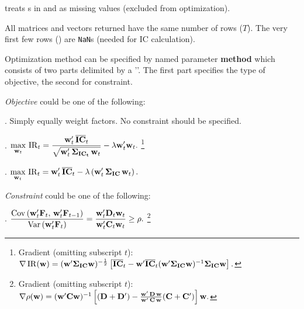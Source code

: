 \begin{enumerate*}
  \item {} treats s in  and  as missing values
       (excluded from optimization).
  \item All matrices and vectors returned have the same number of rows ($T$).
        The very first few rows () are \texttt{NaN}s (needed for IC calculation).
  \item Optimization method can be specified by named parameter \textbf{method}
        which consists of two parts delimited by a '\mcode{:}'. 
        The first part specifies the type of objective, the second for constraint.

        \begin{itemize*}
        \item \emph{Objective} could be one of the following:
	        \begin{enumerate*}
           \setlength{\itemsep}{6pt}
	        \item {}. Simply equally weight factors. No constraint should be specified.
	        \item {}.
		       $\displaystyle
		       \max_{\mathbf{w}_t}\,\operatorname{IR}_t = \frac{\mathbf{w}_t'\,\overline{\mathbf{IC}}_t}
		                                     {\sqrt{\mathbf{w}_t'\,\bm{\Sigma}_{\mathbf{IC_t}}\,\mathbf{w}_t}}
		            - \lambda \mathbf{w}_t'\mathbf{w}_t.
		       $
             \footnote{Gradient (omitting subscript $t$):
             $\nabla\operatorname{IR}(\mathbf{w})=(\mathbf{w}'\bm{\Sigma}_{\mathbf{IC}}\mathbf{w})^{-\frac{1}{2}}
             \left[\overline{\mathbf{IC}}_t-
             \mathbf{w}'\overline{\mathbf{IC}}_t(\mathbf{w}'\bm{\Sigma}_{\mathbf{IC}}\mathbf{w})^{-1}\bm{\Sigma}_{\mathbf{IC}}\mathbf{w}\right].$}
	        \item {}.
		       $\displaystyle
		       \max_{\mathbf{w}_t}\,\operatorname{IR}_t = \mathbf{w}_t'\,\overline{\mathbf{IC}}_t - 
		                                \lambda\left(\mathbf{w}_t'\,\bm{\Sigma}_{\mathbf{IC}}\,\mathbf{w}_t\right).
		       $
	        \end{enumerate*}

        \item \emph{Constraint} could be one of the following:
	        \begin{enumerate*}
           \setlength{\itemsep}{6pt}
	        \item \mcode{'RHO'}.
		       $\displaystyle
		        \frac{\operatorname{Cov}\left(\mathbf{w}_t'\mathbf{F}_t,\,\mathbf{w}_{t}'\mathbf{F}_{t-1}\right)}
		         {\operatorname{Var}\left(\mathbf{w}_t'\mathbf{F}_t\right)} 
             = \frac{\mathbf{w}_t' \mathbf{D}_t \mathbf{w}_t}{\mathbf{w}_t' \mathbf{C}_t \mathbf{w}_t}\geq \rho.
		       $
             \footnote{Gradient (omitting subscript $t$):
             $\nabla\rho(\mathbf{w}) =
             (\mathbf{w}'\mathbf{C}\mathbf{w})^{-1}\left[ (\mathbf{D}+\mathbf{D}')-
             \frac{\mathbf{w}'\,\mathbf{D}\,\mathbf{w}}{\mathbf{w}'\,\mathbf{C}\,\mathbf{w}}(\mathbf{C}+\mathbf{C}') \right]\mathbf{w}.$}


\end{enumerate*}
\end{itemize*}
\end{enumerate*}
